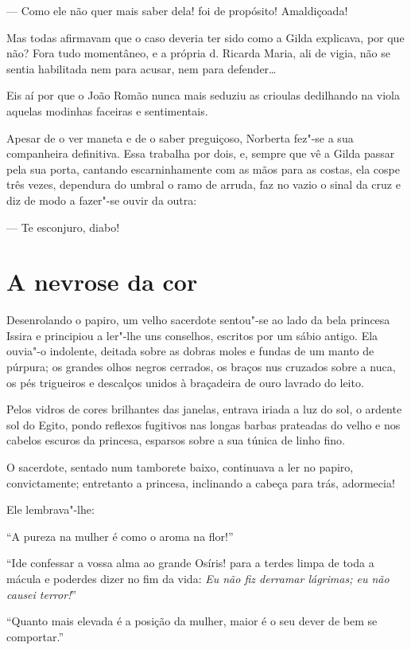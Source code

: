 --- Como ele não quer mais saber dela! foi de propósito! Amaldiçoada!

Mas todas afirmavam que o caso deveria ter sido como a Gilda explicava,
por que não? Fora tudo momentâneo, e a própria d. Ricarda Maria, ali de
vigia, não se sentia habilitada nem para acusar, nem para defender\ldots{}

Eis aí por que o João Romão nunca mais seduziu as crioulas dedilhando na
viola aquelas modinhas faceiras e sentimentais.

Apesar de o ver maneta e de o saber preguiçoso, Norberta fez"-se a sua
companheira definitiva. Essa trabalha por dois, e, sempre que vê a Gilda
passar pela sua porta, cantando escarninhamente com as mãos para as
costas, ela cospe três vezes, dependura do umbral o ramo de arruda, faz
no vazio o sinal da cruz e diz de modo a fazer"-se ouvir da outra:

--- Te esconjuro, diabo!

\chapter{A nevrose da cor}

Desenrolando o papiro, um velho sacerdote sentou"-se ao lado da bela
princesa Issira e principiou a ler"-lhe uns conselhos, escritos por um
sábio antigo. Ela ouvia"-o indolente, deitada sobre as dobras moles e
fundas de um manto de púrpura; os grandes olhos negros cerrados, os
braços nus cruzados sobre a nuca, os pés trigueiros e descalços unidos à
braçadeira de ouro lavrado do leito.

Pelos vidros de cores brilhantes das janelas, entrava iriada a luz do
sol, o ardente sol do Egito, pondo reflexos fugitivos nas longas barbas
prateadas do velho e nos cabelos escuros da princesa, esparsos sobre a
sua túnica de linho fino.

O sacerdote, sentado num tamborete baixo, continuava a ler no papiro,
convictamente; entretanto a princesa, inclinando a cabeça para trás,
adormecia!

Ele lembrava"-lhe:

``A pureza na mulher é como o aroma na flor!''

``Ide confessar a vossa alma ao grande Osíris! para a terdes limpa de
toda a mácula e poderdes dizer no fim da vida: \emph{Eu não fiz derramar
lágrimas; eu não causei terror!}''

``Quanto mais elevada é a posição da mulher, maior é o seu dever de bem
se comportar.''


